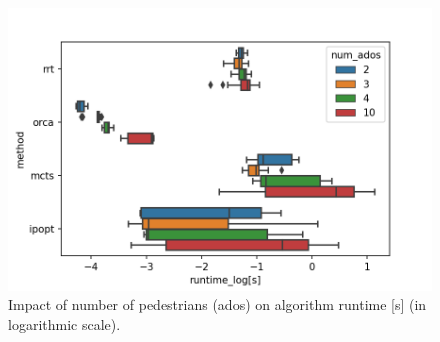 \begin{figure}[!ht]
\begin{center}
\includegraphics[width=\imgwidth]{images/runtime_peds.png}
\end{center}
\caption{Impact of number of pedestrians (ados) on algorithm runtime [s] (in logarithmic scale).}
\label{img:runtime_num_pedestrian}
\end{figure}


